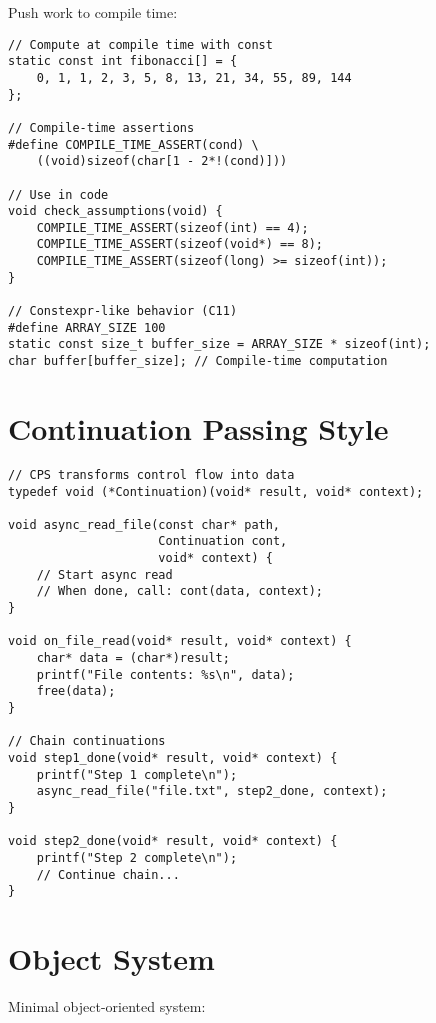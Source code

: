 Push work to compile time:

\begin{lstlisting}
// Compute at compile time with const
static const int fibonacci[] = {
    0, 1, 1, 2, 3, 5, 8, 13, 21, 34, 55, 89, 144
};

// Compile-time assertions
#define COMPILE_TIME_ASSERT(cond) \
    ((void)sizeof(char[1 - 2*!(cond)]))

// Use in code
void check_assumptions(void) {
    COMPILE_TIME_ASSERT(sizeof(int) == 4);
    COMPILE_TIME_ASSERT(sizeof(void*) == 8);
    COMPILE_TIME_ASSERT(sizeof(long) >= sizeof(int));
}

// Constexpr-like behavior (C11)
#define ARRAY_SIZE 100
static const size_t buffer_size = ARRAY_SIZE * sizeof(int);
char buffer[buffer_size]; // Compile-time computation
\end{lstlisting}

\section{Continuation Passing Style}

\begin{lstlisting}
// CPS transforms control flow into data
typedef void (*Continuation)(void* result, void* context);

void async_read_file(const char* path,
                     Continuation cont,
                     void* context) {
    // Start async read
    // When done, call: cont(data, context);
}

void on_file_read(void* result, void* context) {
    char* data = (char*)result;
    printf("File contents: %s\n", data);
    free(data);
}

// Chain continuations
void step1_done(void* result, void* context) {
    printf("Step 1 complete\n");
    async_read_file("file.txt", step2_done, context);
}

void step2_done(void* result, void* context) {
    printf("Step 2 complete\n");
    // Continue chain...
}
\end{lstlisting}

\section{Object System}

Minimal object-oriented system:

